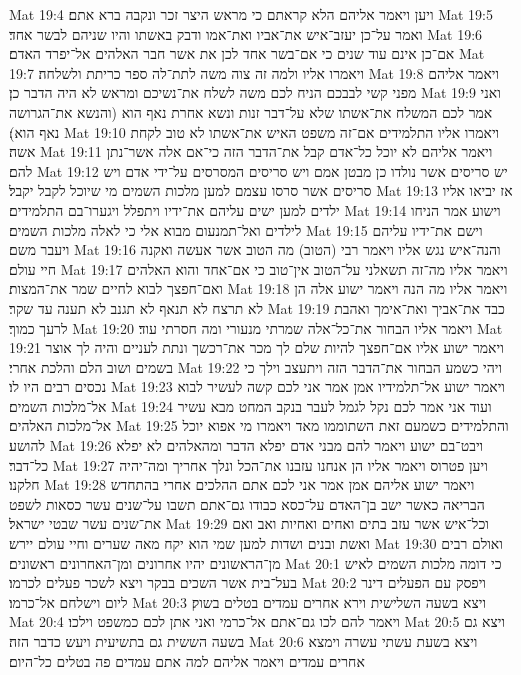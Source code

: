 Mat 19:4  ויען ויאמר אליהם הלא קראתם כי מראש היצר זכר ונקבה ברא אתם׃
Mat 19:5  ואמר על־כן יעזב־איש את־אביו ואת־אמו ודבק באשתו והיו שניהם לבשר אחד׃
Mat 19:6  אם־כן אינם עוד שנים כי אם־בשר אחד לכן את אשר חבר האלהים אל־יפרד האדם׃
Mat 19:7  ויאמרו אליו ולמה זה צוה משה לתת־לה ספר כריתת ולשלחה׃
Mat 19:8  ויאמר אליהם מפני קשי לבבכם הניח לכם משה לשלח את־נשיכם ומראש לא היה הדבר כן׃
Mat 19:9  ואני אמר לכם המשלח את־אשתו שלא על־דבר זנות ונשא אחרת נאף הוא (והנשא את־הגרושה נאף הוא)׃
Mat 19:10  ויאמרו אליו התלמידים אם־זה משפט האיש את־אשתו לא טוב לקחת אשה׃
Mat 19:11  ויאמר אליהם לא יוכל כל־אדם קבל את־הדבר הזה כי־אם אלה אשר־נתן להם׃
Mat 19:12  יש סריסים אשר נולדו כן מבטן אמם ויש סריסים המסרסים על־ידי אדם ויש סריסים אשר סרסו עצמם למען מלכות השמים מי שיוכל לקבל יקבל׃
Mat 19:13  אז יביאו אליו ילדים למען ישים עליהם את־ידיו ויתפלל ויגערו־בם התלמידים׃
Mat 19:14  וישוע אמר הניחו לילדים ואל־תמנעום מבוא אלי כי לאלה מלכות השמים׃
Mat 19:15  וישם את־ידיו עליהם ויעבר משם׃
Mat 19:16  והנה־איש נגש אליו ויאמר רבי (הטוב) מה הטוב אשר אעשה ואקנה חיי עולם׃
Mat 19:17  ויאמר אליו מה־זה תשאלני על־הטוב אין־טוב כי אם־אחד והוא האלהים ואם־חפצך לבוא לחיים שמר את־המצות׃
Mat 19:18  ויאמר אליו מה הנה ויאמר ישוע אלה הן לא תרצח לא תנאף לא תגנב לא תענה עד שקר׃
Mat 19:19  כבד את־אביך ואת־אימך ואהבת לרעך כמוך׃
Mat 19:20  ויאמר אליו הבחור את־כל־אלה שמרתי מנעורי ומה חסרתי עוד׃
Mat 19:21  ויאמר ישוע אליו אם־חפצך להיות שלם לך מכר את־רכשך ונתת לעניים והיה לך אוצר בשמים ושוב הלם והלכת אחרי׃
Mat 19:22  ויהי כשמע הבחור את־הדבר הזה ויתעצב וילך כי נכסים רבים היו לו׃
Mat 19:23  ויאמר ישוע אל־תלמידיו אמן אמר אני לכם קשה לעשיר לבוא אל־מלכות השמים׃
Mat 19:24  ועוד אני אמר לכם נקל לגמל לעבר בנקב המחט מבא עשיר אל־מלכות האלהים׃
Mat 19:25  והתלמידים כשמעם זאת השתוממו מאד ויאמרו מי אפוא יוכל להושע׃
Mat 19:26  ויבט־בם ישוע ויאמר להם מבני אדם יפלא הדבר ומהאלהים לא יפלא כל־דבר׃
Mat 19:27  ויען פטרוס ויאמר אליו הן אנחנו עזבנו את־הכל ונלך אחריך ומה־יהיה חלקנו׃
Mat 19:28  ויאמר ישוע אליהם אמן אמר אני לכם אתם ההלכים אחרי בהתחדש הבריאה כאשר ישב בן־האדם על־כסא כבודו גם־אתם תשבו על־שנים עשר כסאות לשפט את־שנים עשר שבטי ישראל׃
Mat 19:29  וכל־איש אשר עזב בתים ואחים ואחיות ואב ואם ואשת ובנים ושדות למען שמי הוא יקח מאה שערים וחיי עולם יירש׃
Mat 19:30  ואולם רבים מן־הראשונים יהיו אחרונים ומן־האחרונים ראשונים׃
Mat 20:1  כי דומה מלכות השמים לאיש בעל־בית אשר השכים בבקר ויצא לשכר פעלים לכרמו׃
Mat 20:2  ויפסק עם הפעלים דינר ליום וישלחם אל־כרמו׃
Mat 20:3  ויצא בשעה השלישית וירא אחרים עמדים בטלים בשוק׃
Mat 20:4  ויאמר להם לכו גם־אתם אל־כרמי ואני אתן לכם כמשפט וילכו׃
Mat 20:5  ויצא גם בשעה הששית גם בתשיעית ויעש כדבר הזה׃
Mat 20:6  ויצא בשעת עשתי עשרה וימצא אחרים עמדים ויאמר אליהם למה אתם עמדים פה בטלים כל־היום׃
